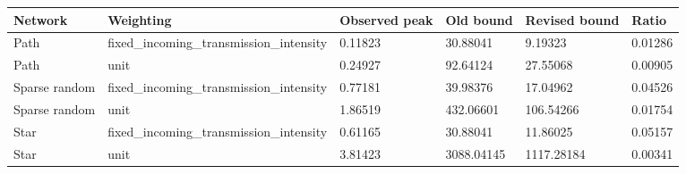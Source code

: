 \begin{tabular}{llllll}
\hline
Network & Weighting & Observed peak & Old bound & Revised bound & Ratio \\
\hline
Path & fixed_incoming_transmission_intensity & 0.11823 & 30.88041 & 9.19323 & 0.01286 \\
Path & unit & 0.24927 & 92.64124 & 27.55068 & 0.00905 \\
Sparse random & fixed_incoming_transmission_intensity & 0.77181 & 39.98376 & 17.04962 & 0.04526 \\
Sparse random & unit & 1.86519 & 432.06601 & 106.54266 & 0.01754 \\
Star & fixed_incoming_transmission_intensity & 0.61165 & 30.88041 & 11.86025 & 0.05157 \\
Star & unit & 3.81423 & 3088.04145 & 1117.28184 & 0.00341 \\
\hline
\end{tabular}
